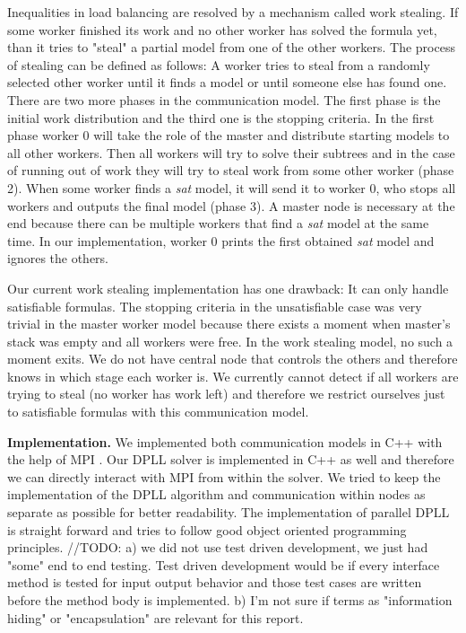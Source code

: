 \documentclass[letterpaper]{article}
\newcommand{\mypar}[1]{{\bf #1.}}
\begin{document}
Inequalities in load balancing are resolved by a mechanism called work stealing.
If some worker finished its work and no other worker has solved the formula yet, than it tries to "steal" a partial model from one of the other workers.
The process of stealing can be defined as follows:
A worker tries to steal from a randomly selected other worker until it finds a model or until someone else has found one.
There are two more phases in the communication model.
The first phase is the initial work distribution and the third one is the stopping criteria.
In the first phase worker 0 will take the role of the master and distribute starting models to all other workers.
Then all workers will try to solve their subtrees and in the case of running out of work they will try to steal work from some other worker (phase 2).
When some worker finds a \textit{sat} model, it will send it to worker 0, who stops all workers and outputs the final model (phase 3).
A master node is necessary at the end because there can be multiple workers that find a \textit{sat} model at the same time.
In our implementation, worker 0 prints the first obtained \textit{sat} model and ignores the others.

Our current work stealing implementation has one drawback:
It can only handle satisfiable formulas.
The stopping criteria in the unsatisfiable case was very trivial in the master worker model because there exists a moment when master's stack was empty and all workers were free.
In the work stealing model, no such a moment exits.
We do not have central node that controls the others and therefore knows in which stage each worker is.
We currently cannot detect if all workers are trying to steal (no worker has work left) and therefore we restrict ourselves just to satisfiable formulas with this communication model.

\mypar{Implementation}
We implemented both communication models in C++ with the help of MPI \cite{mpi}.
Our DPLL solver is implemented in C++ as well and therefore we can directly interact with MPI from within the solver.
We tried to keep the implementation of the DPLL algorithm and communication within nodes as separate as possible for better readability.
The implementation of parallel DPLL is straight forward and tries to follow good object oriented programming principles.
\iffalse
//TODO:
a) we did not use test driven development, we just had "some" end to end testing.
Test driven development would be if every interface method is tested for input output behavior and those test cases are written before the method body is implemented.
b) I'm not sure if terms as "information hiding" or "encapsulation" are relevant for this report.
\end{document}
